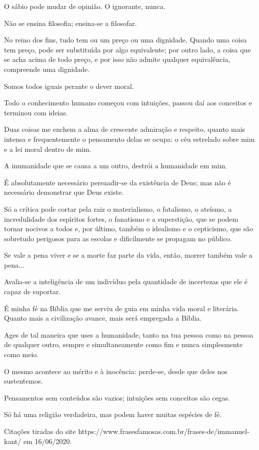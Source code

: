 \emdash{}O sábio pode mudar de opinião. O ignorante, nunca.

\emdash{}Não se ensina filosofia; ensina-se a filosofar.

\emdash{}No reino dos fins, tudo tem ou um preço ou uma dignidade. Quando uma coisa tem preço, pode ser substituída por algo equivalente; por outro lado, a coisa que se acha acima de todo preço, e por isso não admite qualquer equivalência, compreende uma dignidade.

\emdash{}Somos todos iguais perante o dever moral.

\emdash{}Todo o conhecimento humano começou com intuições, passou daí aos conceitos e terminou com ideias.

\emdash{}Duas coisas me enchem a alma de crescente admiração e respeito, quanto mais intensa e frequentemente o pensamento delas se ocupa: o céu estrelado sobre mim e a lei moral dentro de mim.

\emdash{}A inumanidade que se causa a um outro, destrói a humanidade em mim.

\emdash{}É absolutamente necessário persuadir-se da existência de Deus; mas não é necessário demonstrar que Deus existe.

\emdash{}Só a crítica pode cortar pela raiz o materialismo, o fatalismo, o ateísmo, a incredulidade dos espíritos fortes, o fanatismo e a superstição, que se podem tornar nocivos a todos e, por último, também o idealismo e o cepticismo, que são sobretudo perigosos para as escolas e dificilmente se propagam no público.

\emdash{}Se vale a pena viver e se a morte faz parte da vida, então, morrer também vale a pena...

\emdash{}Avalia-se a inteligência de um indivíduo pela quantidade de incertezas que ele é capaz de suportar.

\emdash{}É minha fé na Bíblia que me serviu de guia em minha vida moral e literária. Quanto mais a civilização avance, mais será empregada a Bíblia.

\emdash{}Ages de tal maneira que uses a humanidade, tanto na tua pessoa como na pessoa de qualquer outro, sempre e simultaneamente como fim e nunca simplesmente como meio.

\emdash{}O mesmo acontece ao mérito e à inocência: perde-se, desde que deles nos sustentemos.

\emdash{}Pensamentos sem conteúdos são vazios; intuições sem conceitos são cegas.

\emdash{}Só há uma religião verdadeira, mas podem haver muitas espécies de fé.

\emdash{}Citações tiradas do site https://www.frasesfamosas.com.br/frases-de/immanuel-kant/ em 16/06/2020.